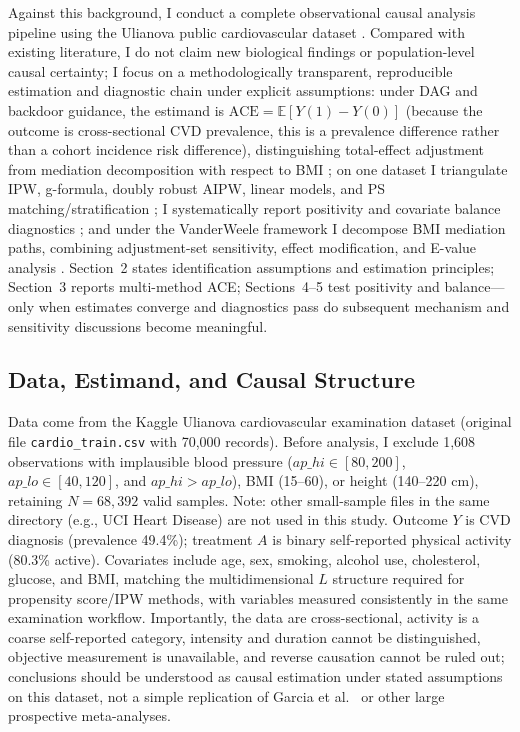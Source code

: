 \documentclass[12pt,a4paper]{article}
\newcommand{\E}{\mathbb{E}}
\begin{document}
Against this background, I conduct a complete observational causal analysis pipeline using the Ulianova public cardiovascular dataset \cite{ulianova2019kaggle}. Compared with existing literature, I do not claim new biological findings or population-level causal certainty; I focus on a methodologically transparent, reproducible estimation and diagnostic chain under explicit assumptions: under DAG and backdoor guidance, the estimand is $\mathrm{ACE}=\E[Y(1)-Y(0)]$ (because the outcome is cross-sectional CVD prevalence, this is a prevalence difference rather than a cohort incidence risk difference), distinguishing total-effect adjustment from mediation decomposition with respect to BMI \cite{hernan2024whatif,vanderweele2015explanation}; on one dataset I triangulate IPW, g-formula, doubly robust AIPW, linear models, and PS matching/stratification \cite{hernan2024whatif,rosenbaum1983central,robins1994estimation,shahu2023comparison}; I systematically report positivity and covariate balance diagnostics \cite{chen2024iptw}; and under the VanderWeele framework I decompose BMI mediation paths, combining adjustment-set sensitivity, effect modification, and E-value analysis \cite{vanderweele2015explanation,vanderweele2017evalue}. Section~2 states identification assumptions and estimation principles; Section~3 reports multi-method ACE; Sections~4--5 test positivity and balance---only when estimates converge and diagnostics pass do subsequent mechanism and sensitivity discussions become meaningful.

\subsection{Data, Estimand, and Causal Structure}

Data come from the Kaggle Ulianova cardiovascular examination dataset \cite{ulianova2019kaggle} (original file \texttt{cardio\_train.csv} with 70{,}000 records). Before analysis, I exclude 1{,}608 observations with implausible blood pressure ($ap\_hi\in[80,200]$, $ap\_lo\in[40,120]$, and $ap\_hi>ap\_lo$), BMI (15--60), or height (140--220 cm), retaining $N=68{,}392$ valid samples. Note: other small-sample files in the same directory (e.g., UCI Heart Disease) are not used in this study. Outcome $Y$ is CVD diagnosis (prevalence 49.4\%); treatment $A$ is binary self-reported physical activity (80.3\% active). Covariates include age, sex, smoking, alcohol use, cholesterol, glucose, and BMI, matching the multidimensional $L$ structure required for propensity score/IPW methods, with variables measured consistently in the same examination workflow. Importantly, the data are cross-sectional, activity is a coarse self-reported category, intensity and duration cannot be distinguished, objective measurement is unavailable, and reverse causation cannot be ruled out; conclusions should be understood as causal estimation under stated assumptions on this dataset, not a simple replication of Garcia et al.\ \cite{garcia2023meta} or other large prospective meta-analyses.
\end{document}
